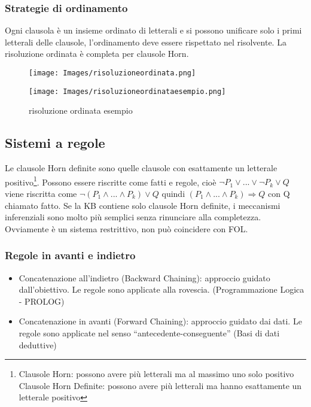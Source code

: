 \documentclass{article}
\begin{document}
\subsubsection{Strategie di ordinamento}
Ogni clausola è un insieme ordinato di letterali e si possono unificare solo i primi letterali delle clausole, l’ordinamento deve essere rispettato nel risolvente. La risoluzione ordinata è completa per clausole Horn.
\begin{figure}[H]
\centering
\texttt{[image: Images/risoluzioneordinata.png]}
\end{figure}
\begin{figure}[H]
\centering
\texttt{[image: Images/risoluzioneordinataesempio.png]}
\caption{risoluzione ordinata esempio}
\end{figure}

\subsection{Sistemi a regole}
Le clausole Horn definite sono quelle clausole con esattamente un letterale positivo\footnote{Clausole Horn: possono avere più letterali ma al massimo uno solo positivo \newline Clausole Horn Definite: possono avere più letterali ma hanno esattamente un letterale positivo}. Possono essere riscritte come fatti e regole, cioè \newline
$\neg P_1 \lor ... \lor \neg P_k \lor Q$ \quad viene riscritta come \newline
$\neg (P_1 \land ... \land P_k) \lor Q$ \quad quindi \newline
$(P_1 \land ... \land P_k) \Rightarrow Q$ \quad con Q chiamato fatto. \newline
Se la KB contiene solo clausole Horn definite, i meccanismi inferenziali sono molto più semplici senza rinunciare alla completezza. Ovviamente è un sistema restrittivo, non può coincidere con FOL.

\subsubsection{Regole in avanti e indietro}
\begin{itemize}
    \item Concatenazione all'indietro (Backward Chaining): approccio guidato dall'obiettivo. Le regole sono applicate alla rovescia. (Programmazione Logica - PROLOG)
    \item Concatenazione in avanti (Forward Chaining): approccio guidato dai dati. Le regole sono applicate nel senso “antecedente-conseguente” (Basi di dati deduttive)
\end{itemize}
\end{document}
